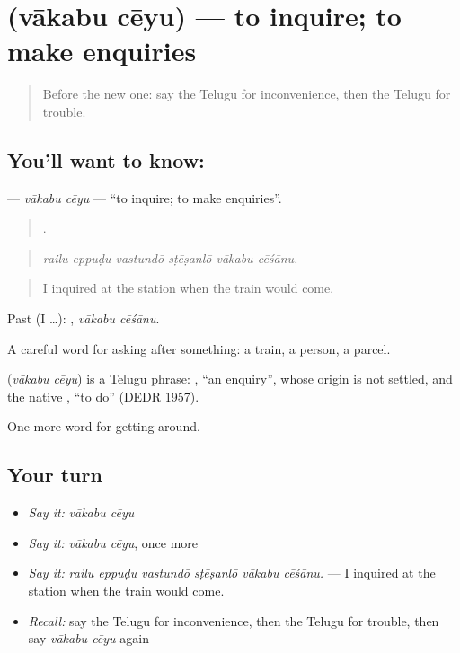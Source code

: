 \section[\texorpdfstring{\te{వాకబు} \te{చేయు} (vākabu cēyu)}{వాకబు చేయు (vākabu cēyu)}]{  (vākabu cēyu) — to inquire; to make enquiries}

\label{lesson:TE-C460-vakabu-ceyu}



\begin{quote}
Before the new one: say the Telugu for inconvenience, then the Telugu for trouble.
\end{quote}

\subsection*{You'll want to know:  }
\textbf{ } — \emph{vākabu cēyu} — \textquotedblleft{}to inquire; to make enquiries\textquotedblright{}.

\begin{quote}
     .
\end{quote}

\begin{quote}
\emph{railu eppuḍu vastundō sṭēṣanlō vākabu cēśānu.}
\end{quote}

\begin{quote}
I inquired at the station when the train would come.
\end{quote}

Past (I …):  , \emph{vākabu cēśānu}.

A careful word for asking after something: a train, a person, a parcel.

\begin{cousinweb}
\textbf{ } (\emph{vākabu cēyu}) is a Telugu phrase: , \textquotedblleft{}an enquiry\textquotedblright{}, whose origin is not settled, and the native , \textquotedblleft{}to do\textquotedblright{} (DEDR 1957).
\end{cousinweb}

\begin{grammarlens}[title={What you've built}]
One more word for getting around.
\end{grammarlens}

\subsection*{Your turn}
\begin{itemize}
\raggedright
  \item \emph{Say it:} \emph{vākabu cēyu}
  \item \emph{Say it:} \emph{vākabu cēyu}, once more
  \item \emph{Say it:} \emph{railu eppuḍu vastundō sṭēṣanlō vākabu cēśānu.} — I inquired at the station when the train would come.
  \item \emph{Recall:} say the Telugu for inconvenience, then the Telugu for trouble, then say \emph{vākabu cēyu} again
\end{itemize}

